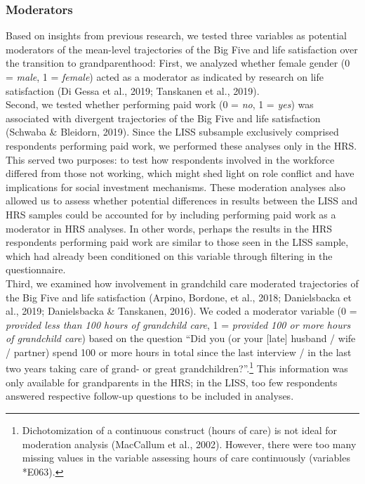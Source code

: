\documentclass[
  english,
  man, noextraspace]{apa7}
\begin{document}
\hypertarget{moderators}{%
\subsubsection{Moderators}\label{moderators}}

Based on insights from previous research, we tested three variables as potential moderators of the mean-level trajectories of the Big Five and life satisfaction over the transition to grandparenthood: First, we analyzed whether female gender (0 = \emph{male}, 1 = \emph{female}) acted as a moderator as indicated by research on life satisfaction (Di Gessa et al., 2019; Tanskanen et al., 2019).\\
Second, we tested whether performing paid work (0 = \emph{no}, 1 = \emph{yes}) was associated with divergent trajectories of the Big Five and life satisfaction (Schwaba \& Bleidorn, 2019). Since the LISS subsample exclusively comprised respondents performing paid work, we performed these analyses only in the HRS. This served two purposes: to test how respondents involved in the workforce differed from those not working, which might shed light on role conflict and have implications for social investment mechanisms. These moderation analyses also allowed us to assess whether potential differences in results between the LISS and HRS samples could be accounted for by including performing paid work as a moderator in HRS analyses. In other words, perhaps the results in the HRS respondents performing paid work are similar to those seen in the LISS sample, which had already been conditioned on this variable through filtering in the questionnaire.\\
Third, we examined how involvement in grandchild care moderated trajectories of the Big Five and life satisfaction (Arpino, Bordone, et al., 2018; Danielsbacka et al., 2019; Danielsbacka \& Tanskanen, 2016). We coded a moderator variable (0 = \emph{provided less than 100 hours of grandchild care}, 1 = \emph{provided 100 or more hours of grandchild care}) based on the question \enquote{Did you (or your {[}late{]} husband / wife / partner) spend 100 or more hours in total since the last interview / in the last two years taking care of grand- or great grandchildren?}.\footnote{Dichotomization of a continuous construct (hours of care) is not ideal for moderation analysis (MacCallum et al., 2002). However, there were too many missing values in the variable assessing hours of care continuously (variables *E063).} This information was only available for grandparents in the HRS; in the LISS, too few respondents answered respective follow-up questions to be included in analyses.
\end{document}
